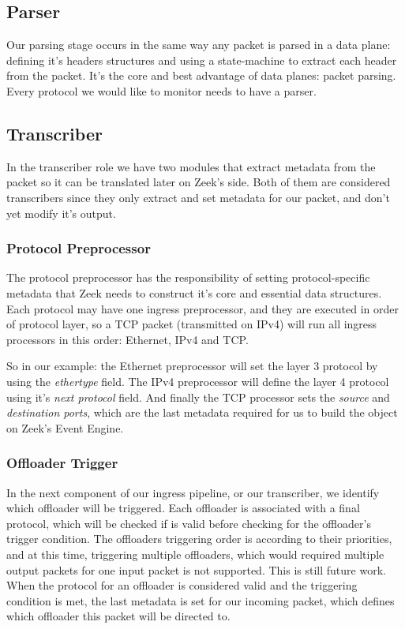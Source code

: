 \subsection{Parser}

Our parsing stage occurs in the same way any packet is parsed in a data plane: defining it's headers structures and using a state-machine to extract each header from the packet. It's the core and best advantage of data planes: packet parsing. Every protocol we would like to monitor needs to have a parser.

\subsection{Transcriber}

In the transcriber role we have two modules that extract metadata from the packet so it can be translated later on Zeek's side. Both of them are considered transcribers since they only extract and set metadata for our packet, and don't yet modify it's output.

\subsubsection{Protocol Preprocessor}

The protocol preprocessor has the responsibility of setting protocol-specific metadata that Zeek needs to construct it's core and essential data structures. Each protocol may have one ingress preprocessor, and they are executed in order of protocol layer, so a TCP packet (transmitted on IPv4) will run all ingress processors in this order: Ethernet, IPv4 and TCP.

So in our example: the Ethernet preprocessor will set the layer 3 protocol by using the \textit{ethertype} field. The IPv4 preprocessor will define the layer 4 protocol using it's \textit{next protocol} field. And finally the TCP processor sets the \textit{source} and \textit{destination ports}, which are the last metadata required for us to build the \zeekconn{} object on Zeek's Event Engine.

\subsubsection{Offloader Trigger}

In the next component of our ingress pipeline, or our transcriber, we identify which offloader will be triggered. Each offloader is associated with a final protocol, which will be checked if is valid before checking for the offloader's trigger condition. The offloaders triggering order is according to their priorities, and at this time, triggering multiple offloaders, which would required multiple output packets for one input packet is not supported. This is still future work. When the protocol for an offloader is considered valid and the triggering condition is met, the last metadata is set for our incoming packet, which defines which offloader this packet will be directed to.


